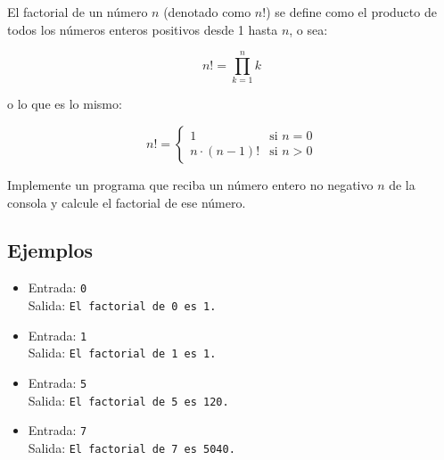 El factorial de un número $n$ (denotado como $n!$) se define como el producto de todos los números enteros positivos desde 1 hasta $n$, o sea:

\[
n! = \prod_{k=1}^{n} k
\]

o lo que es lo mismo:

\[
n! =
\begin{cases} 
1 & \text{si } n = 0 \\
n \cdot (n-1)! & \text{si } n > 0
\end{cases}
\]

Implemente un programa que reciba un número entero no negativo \(n\) de la consola y calcule el factorial de ese número.

\subsection*{Ejemplos}
\begin{itemize}
    \item Entrada: \texttt{0}\\
          Salida: \texttt{El factorial de 0 es 1.}
    \item Entrada: \texttt{1}\\
          Salida: \texttt{El factorial de 1 es 1.}
    \item Entrada: \texttt{5}\\
          Salida: \texttt{El factorial de 5 es 120.}
    \item Entrada: \texttt{7}\\
          Salida: \texttt{El factorial de 7 es 5040.}
\end{itemize}
